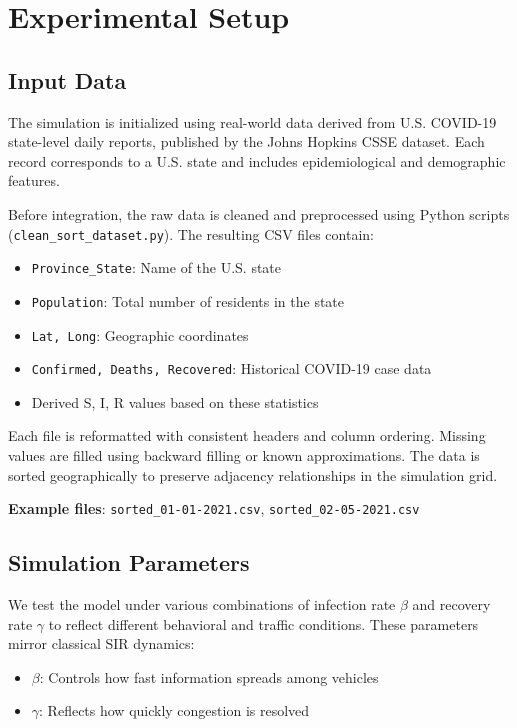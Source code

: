 \section{Experimental Setup}

\subsection{Input Data}
The simulation is initialized using real-world data derived from U.S. COVID-19 state-level daily reports, published by the Johns Hopkins CSSE dataset. Each record corresponds to a U.S. state and includes epidemiological and demographic features.

Before integration, the raw data is cleaned and preprocessed using Python scripts (\texttt{clean\_sort\_dataset.py}). The resulting CSV files contain:
\begin{itemize}
    \item \texttt{Province\_State}: Name of the U.S. state
    \item \texttt{Population}: Total number of residents in the state
    \item \texttt{Lat, Long}: Geographic coordinates
    \item \texttt{Confirmed, Deaths, Recovered}: Historical COVID-19 case data
    \item Derived S, I, R values based on these statistics
\end{itemize}

Each file is reformatted with consistent headers and column ordering. Missing values are filled using backward filling or known approximations. The data is sorted geographically to preserve adjacency relationships in the simulation grid.

\textbf{Example files}: \texttt{sorted\_01-01-2021.csv}, \texttt{sorted\_02-05-2021.csv}

\subsection{Simulation Parameters}
We test the model under various combinations of infection rate \( \beta \) and recovery rate \( \gamma \) to reflect different behavioral and traffic conditions. These parameters mirror classical SIR dynamics:
\begin{itemize}
    \item \( \beta \): Controls how fast information spreads among vehicles
    \item \( \gamma \): Reflects how quickly congestion is resolved
\end{itemize}

